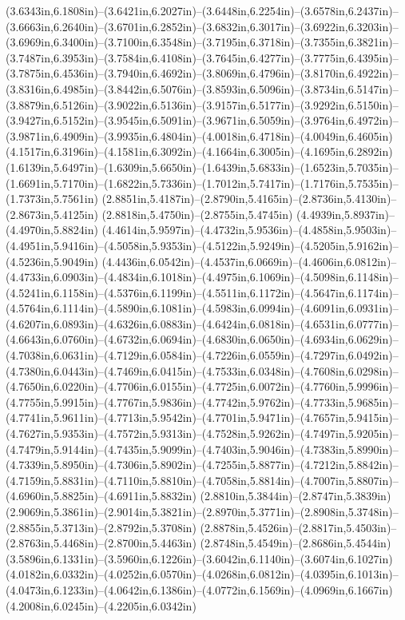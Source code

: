 (3.6343in,6.1808in)--(3.6421in,6.2027in)--(3.6448in,6.2254in)--(3.6578in,6.2437in)--(3.6663in,6.2640in)--(3.6701in,6.2852in)--(3.6832in,6.3017in)--(3.6922in,6.3203in)--(3.6969in,6.3400in)--(3.7100in,6.3548in)--(3.7195in,6.3718in)--(3.7355in,6.3821in)--(3.7487in,6.3953in)--(3.7584in,6.4108in)--(3.7645in,6.4277in)--(3.7775in,6.4395in)--(3.7875in,6.4536in)--(3.7940in,6.4692in)--(3.8069in,6.4796in)--(3.8170in,6.4922in)--(3.8316in,6.4985in)--(3.8442in,6.5076in)--(3.8593in,6.5096in)--(3.8734in,6.5147in)--(3.8879in,6.5126in)--(3.9022in,6.5136in)--(3.9157in,6.5177in)--(3.9292in,6.5150in)--(3.9427in,6.5152in)--(3.9545in,6.5091in)--(3.9671in,6.5059in)--(3.9764in,6.4972in)--(3.9871in,6.4909in)--(3.9935in,6.4804in)--(4.0018in,6.4718in)--(4.0049in,6.4605in) (4.1517in,6.3196in)--(4.1581in,6.3092in)--(4.1664in,6.3005in)--(4.1695in,6.2892in) (1.6139in,5.6497in)--(1.6309in,5.6650in)--(1.6439in,5.6833in)--(1.6523in,5.7035in)--(1.6691in,5.7170in)--(1.6822in,5.7336in)--(1.7012in,5.7417in)--(1.7176in,5.7535in)--(1.7373in,5.7561in) (2.8851in,5.4187in)--(2.8790in,5.4165in)--(2.8736in,5.4130in)--(2.8673in,5.4125in) (2.8818in,5.4750in)--(2.8755in,5.4745in) (4.4939in,5.8937in)--(4.4970in,5.8824in) (4.4614in,5.9597in)--(4.4732in,5.9536in)--(4.4858in,5.9503in)--(4.4951in,5.9416in)--(4.5058in,5.9353in)--(4.5122in,5.9249in)--(4.5205in,5.9162in)--(4.5236in,5.9049in) (4.4436in,6.0542in)--(4.4537in,6.0669in)--(4.4606in,6.0812in)--(4.4733in,6.0903in)--(4.4834in,6.1018in)--(4.4975in,6.1069in)--(4.5098in,6.1148in)--(4.5241in,6.1158in)--(4.5376in,6.1199in)--(4.5511in,6.1172in)--(4.5647in,6.1174in)--(4.5764in,6.1114in)--(4.5890in,6.1081in)--(4.5983in,6.0994in)--(4.6091in,6.0931in)--(4.6207in,6.0893in)--(4.6326in,6.0883in)--(4.6424in,6.0818in)--(4.6531in,6.0777in)--(4.6643in,6.0760in)--(4.6732in,6.0694in)--(4.6830in,6.0650in)--(4.6934in,6.0629in)--(4.7038in,6.0631in)--(4.7129in,6.0584in)--(4.7226in,6.0559in)--(4.7297in,6.0492in)--(4.7380in,6.0443in)--(4.7469in,6.0415in)--(4.7533in,6.0348in)--(4.7608in,6.0298in)--(4.7650in,6.0220in)--(4.7706in,6.0155in)--(4.7725in,6.0072in)--(4.7760in,5.9996in)--(4.7755in,5.9915in)--(4.7767in,5.9836in)--(4.7742in,5.9762in)--(4.7733in,5.9685in)--(4.7741in,5.9611in)--(4.7713in,5.9542in)--(4.7701in,5.9471in)--(4.7657in,5.9415in)--(4.7627in,5.9353in)--(4.7572in,5.9313in)--(4.7528in,5.9262in)--(4.7497in,5.9205in)--(4.7479in,5.9144in)--(4.7435in,5.9099in)--(4.7403in,5.9046in)--(4.7383in,5.8990in)--(4.7339in,5.8950in)--(4.7306in,5.8902in)--(4.7255in,5.8877in)--(4.7212in,5.8842in)--(4.7159in,5.8831in)--(4.7110in,5.8810in)--(4.7058in,5.8814in)--(4.7007in,5.8807in)--(4.6960in,5.8825in)--(4.6911in,5.8832in) (2.8810in,5.3844in)--(2.8747in,5.3839in) (2.9069in,5.3861in)--(2.9014in,5.3821in)--(2.8970in,5.3771in)--(2.8908in,5.3748in)--(2.8855in,5.3713in)--(2.8792in,5.3708in) (2.8878in,5.4526in)--(2.8817in,5.4503in)--(2.8763in,5.4468in)--(2.8700in,5.4463in) (2.8748in,5.4549in)--(2.8686in,5.4544in) (3.5896in,6.1331in)--(3.5960in,6.1226in)--(3.6042in,6.1140in)--(3.6074in,6.1027in) (4.0182in,6.0332in)--(4.0252in,6.0570in)--(4.0268in,6.0812in)--(4.0395in,6.1013in)--(4.0473in,6.1233in)--(4.0642in,6.1386in)--(4.0772in,6.1569in)--(4.0969in,6.1667in) (4.2008in,6.0245in)--(4.2205in,6.0342in) 